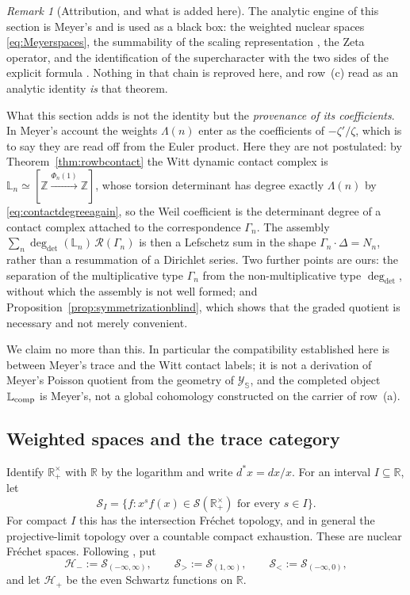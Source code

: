 \documentclass[11pt]{amsart}
\theoremstyle{definition}
\theoremstyle{remark}
\newtheorem{remark}[theorem]{Remark}
\newcommand{\R}{\mathbb R}
\newcommand{\Z}{\mathbb Z}
\begin{document}
\begin{remark}[Attribution, and what is added here]
\label{rem:rowcattribution}
The analytic engine of this section is Meyer's and is used as a black box:
the weighted nuclear spaces \eqref{eq:Meyerspaces}, the summability of the
scaling representation \cite[Proposition~5.6]{MeyerZeta}, the Zeta operator,
and the identification of the supercharacter with the two sides of the
explicit formula \cite[Theorem~5.8]{MeyerZeta}.  Nothing in that chain is
reproved here, and row~(c) read as an analytic identity \emph{is} that
theorem.

What this section adds is not the identity but the \emph{provenance of its
coefficients}.  In Meyer's account the weights $\Lambda(n)$ enter as the
coefficients of $-\zeta'/\zeta$, which is to say they are read off from the
Euler product.  Here they are not postulated: by
Theorem~\ref{thm:rowbcontact} the Witt dynamic contact complex is
$\mathbb L_n\simeq[\Z\xrightarrow{\Phi_n(1)}\Z]$, whose torsion determinant
has degree exactly $\Lambda(n)$ by \eqref{eq:contactdegreeagain}, so the Weil
coefficient is the determinant degree of a contact complex attached to the
correspondence $\Gamma_n$.  The
assembly $\sum_n\deg_{\det}(\mathbb L_n)\,\mathcal R(\Gamma_n)$ is then a
Lefschetz sum in the shape $\Gamma_n\cdot\Delta=N_n$, rather than a
resummation of a Dirichlet series.  Two further points are ours: the
separation of the multiplicative type $\Gamma_n$ from the non-multiplicative
type $\deg_{\det}$, without which the assembly is not well formed; and
Proposition~\ref{prop:symmetrizationblind}, which shows that the graded
quotient is necessary and not merely convenient.

We claim no more than this.  In particular the compatibility established
here is between Meyer's trace and the Witt contact labels; it is not a
derivation of Meyer's Poisson quotient from the geometry of
$\mathscr Y_{\mathbb S}$, and the completed object $\mathbb L_{\rm comp}$ is
Meyer's, not a global cohomology constructed on the carrier of row~(a).
\end{remark}

\subsection{Weighted spaces and the trace category}

Identify $\R_+^\times$ with $\R$ by the logarithm and write
$d^*x=dx/x$.  For an interval $I\subseteq\R$, let
\begin{equation}\label{eq:weightedSchwartz}
 \mathcal S_I=\{f:x^sf(x)\in\mathcal S(\R_+^\times)
                  \text{ for every }s\in I\}.
\end{equation}
For compact $I$ this has the intersection Fr\'echet topology, and in
general the projective-limit topology over a countable compact exhaustion.
These are nuclear Fr\'echet spaces.  Following
\cite[\S2]{MeyerZeta}, put
\begin{equation}\label{eq:Meyerspaces}
 \mathcal H_-:=\mathcal S_{(-\infty,\infty)},\qquad
 \mathcal S_>:=\mathcal S_{(1,\infty)},\qquad
 \mathcal S_<:=\mathcal S_{(-\infty,0)},
\end{equation}
and let $\mathcal H_+$ be the even Schwartz functions on $\R$.
\end{document}
